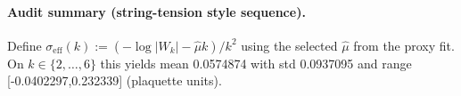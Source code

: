 \paragraph{Audit summary (string-tension style sequence).} \AuditTag Define $\sigma_{\mathrm{eff}}(k):=(-\log|W_k|-\widehat\mu k)/k^2$ using the selected $\widehat\mu$ from the proxy fit. On $k\in\{2,\dots,6\}$ this yields mean 0.0574874 with std 0.0937095 and range [-0.0402297,0.232339] (plaquette units).